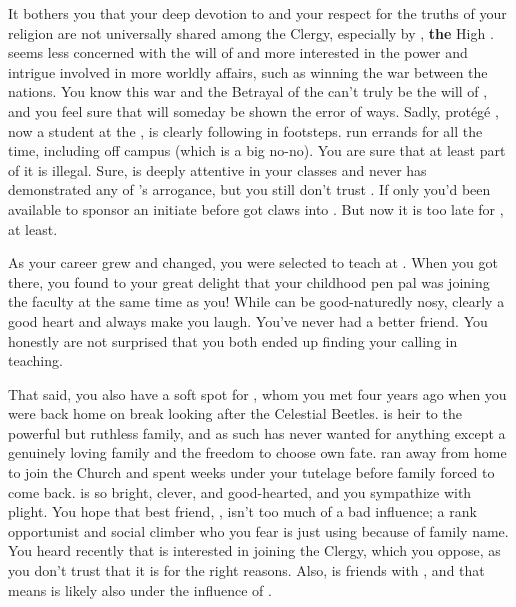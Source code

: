 \documentclass[char]{GL2020}
\begin{document}
It bothers you that your deep devotion to \cTechGod{} and your respect for the truths of your religion are not universally shared among the Clergy, especially by \cAntiChup{\full}, \textbf{the} High \cAntiChup{\Cleric}. \cAntiChup{} seems less concerned with the will of \cTechGod{} and more interested in the power and intrigue involved in more worldly affairs, such as winning the war between the nations. You know this war and the Betrayal of the \pShippies{} can't truly be the will of \cTechGod{}, and you feel sure that \cAntiChup{} will someday be shown the error of \cAntiChup{\their} ways. Sadly, \cAntiChup{\their} protégé \cScholarship{\full}, now a student at the \pSchool{}, is clearly following in \cAntiChup{\their} footsteps. \cScholarship{\They} run\cScholarship{\verbs} errands for \cAntiChup{} all the time, including off campus (which is a big no-no). You are sure that at least part of it is illegal. Sure, \cScholarship{} is deeply attentive in your classes and never has demonstrated any of \cAntiChup{}’s arrogance, but you still don’t trust \cScholarship{\them}. If only you'd been available to sponsor an initiate before \cAntiChup{} got \cAntiChup{\their} claws into \cScholarship{}. But now it is too late for \cScholarship{}, at least.

As your career grew and changed, you were selected to teach at \pSchool{}. When you got there, you found to your great delight that your childhood pen pal \cMusic{} was joining the faculty at the same time as you! While \cMusic{} can be good-naturedly nosy, \cMusic{\they} clearly \cMusic{\have} a good heart and always make\cMusic{\verbs} you laugh. You've never had a better friend. You honestly are not surprised that you both ended up finding your calling in teaching.

That said, you also have a soft spot for \cHeir{\full}, whom you met four years ago when you were back home on break looking after the Celestial Beetles. \cHeir{} is heir to the powerful but ruthless \cHeir{\formal} family, and as such has never wanted for anything except a genuinely loving family and the freedom to choose \cHeir{\their} own fate. \cHeir{\They} ran away from home to join the Church and spent weeks under your tutelage before \cHeir{\their} family forced \cHeir{\them} to come back. \cHeir{} is so bright, clever, and good-hearted, and you sympathize with \cHeir{\their} plight. You hope that \cHeir{\their} best friend, \cAmbition{\full}, isn't too much of a bad influence; \cAmbition{\theyare} a rank opportunist and social climber who you fear is just using \cHeir{} because of \cHeir{\their} family name. You heard recently that \cAmbition{} is interested in joining the Clergy, which you oppose, as you don't trust that it is for the right reasons. Also, \cAmbition{} is friends with \cScholarship{}, and that means \cAmbition{} is likely also under the influence of \cAntiChup{}.
\end{document}
